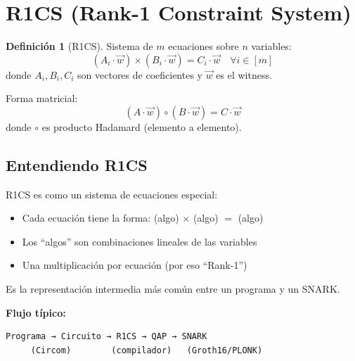 \documentclass[11pt,a4paper,twoside,openright]{book}
\theoremstyle{definition}
\newtheorem{definition}{Definición}[chapter]
\theoremstyle{plain}
\theoremstyle{remark}
\begin{document}
\section{R1CS (Rank-1 Constraint System)}

\begin{definition}[R1CS]
Sistema de $m$ ecuaciones sobre $n$ variables:
\[
(A_i \cdot \vec{w}) \times (B_i \cdot \vec{w}) = C_i \cdot \vec{w} \quad \forall i \in [m]
\]
donde $A_i, B_i, C_i$ son vectores de coeficientes y $\vec{w}$ es el witness.
\end{definition}

Forma matricial:
\[
(A \cdot \vec{w}) \circ (B \cdot \vec{w}) = C \cdot \vec{w}
\]
donde $\circ$ es producto Hadamard (elemento a elemento).

\subsection{Entendiendo R1CS}

\begin{intuicion}
R1CS es como un sistema de ecuaciones especial:
\begin{itemize}
    \item Cada ecuación tiene la forma: (algo) $\times$ (algo) $=$ (algo)
    \item Los ``algos'' son combinaciones lineales de las variables
    \item Una multiplicación por ecuación (por eso ``Rank-1'')
\end{itemize}

Es la representación intermedia más común entre un programa y un SNARK.

\textbf{Flujo típico:}
\begin{verbatim}
Programa → Circuito → R1CS → QAP → SNARK
     (Circom)        (compilador)   (Groth16/PLONK)
\end{verbatim}
\end{intuicion}
\end{document}
